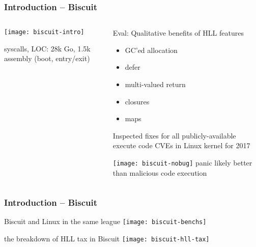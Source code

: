 \begin{frame}[plain]
	\frametitle{Introduction -- Biscuit}
	
	\begin{columns}
		
		\begin{column}{.4\textwidth}
			
			\texttt{[image: biscuit-intro]}
			
			 syscalls, LOC: 28k Go,
			1.5k assembly (boot, entry/exit)
			
		\end{column}
		
		\begin{column}{.6\textwidth}
			Eval:  Qualitative benefits of HLL features
			
			\begin{itemize}
				\item GC’ed allocation
				
				
				\item  defer
				
				
				\item multi-valued return
				
				
				\item  closures
				
				\item maps
				
			\end{itemize}
		Inspected fixes for all publicly-available execute code CVEs in
		Linux kernel for 2017
		
			\texttt{[image: biscuit-nobug]}
			panic likely better than malicious code execution
			
		\end{column}
	\end{columns}	
\end{frame}



\begin{frame}[plain]
	\frametitle{Introduction -- Biscuit}
	\centering
 Biscuit and Linux in the same league	
 \texttt{[image: biscuit-benchs]}
 
  the breakdown of HLL tax in Biscuit
 \texttt{[image: biscuit-hll-tax]}

\end{frame}

